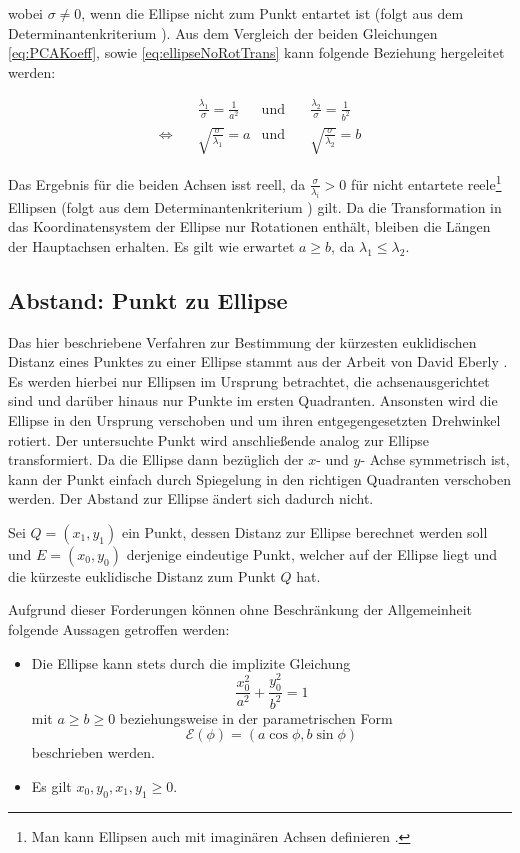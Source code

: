 wobei $\sigma \neq 0$, wenn die Ellipse nicht zum Punkt entartet ist (folgt aus dem Determinantenkriterium \cite{Lawrence1972}). Aus dem Vergleich der beiden Gleichungen \ref{eq:PCAKoeff}, sowie \ref{eq:ellipseNoRotTrans} kann folgende Beziehung hergeleitet werden:

\begin{equation}
\begin{aligned}
&\frac{\lambda_1}{\sigma} = \frac{1}{a^2} &\text{und}\quad &\frac{\lambda_2}{\sigma} = \frac{1}{b^2}\\
\Leftrightarrow\quad & \sqrt{\frac{\sigma}{\lambda_1}}  = a  &\text{und}\quad & \sqrt{\frac{\sigma}{\lambda_2}}  = b
\end{aligned}
\end{equation}

Das Ergebnis für die beiden Achsen isst reell, da $\frac{\sigma}{\lambda_i} > 0$ für nicht entartete reele\footnote{Man kann Ellipsen auch mit imaginären Achsen definieren \cite{Lawrence1972}.}  Ellipsen (folgt aus dem Determinantenkriterium \cite{Lawrence1972}) gilt. Da die Transformation in das Koordinatensystem der Ellipse nur Rotationen enthält,  bleiben die Längen der Hauptachsen erhalten. Es gilt wie erwartet $a \geq b$, da $\lambda_1 \leq \lambda_2$.


\subsection{Abstand: Punkt zu Ellipse}
\label{sc:distPointEllipse}
Das hier beschriebene Verfahren zur Bestimmung der kürzesten euklidischen Distanz eines Punktes zu einer Ellipse stammt aus der Arbeit von David Eberly \cite{Eberly2013}.
Es werden hierbei nur Ellipsen im Ursprung betrachtet, die achsenausgerichtet sind und darüber hinaus nur Punkte im ersten Quadranten. Ansonsten wird die Ellipse in den Ursprung verschoben und um ihren entgegengesetzten Drehwinkel rotiert.
Der untersuchte Punkt wird anschließende analog zur Ellipse transformiert.
Da die Ellipse dann bezüglich der $x$- und $y$- Achse symmetrisch ist, kann der Punkt einfach durch Spiegelung in den richtigen Quadranten verschoben werden. Der Abstand zur Ellipse ändert sich dadurch nicht.

Sei $Q = (x_1, y_1)$ ein Punkt, dessen Distanz zur Ellipse berechnet werden soll und $E = (x_0, y_0)$ derjenige eindeutige Punkt, welcher auf der Ellipse liegt und die kürzeste euklidische Distanz zum Punkt $Q$ hat.

Aufgrund dieser Forderungen können ohne Beschränkung der Allgemeinheit folgende Aussagen getroffen werden:
\begin{itemize}
	\item Die Ellipse kann stets durch die implizite Gleichung
	\begin{equation}\label{eq:distEqParam} \frac{x_0^2}{a^2} + \frac{y_0^2}{b^2} = 1\end{equation}
	 mit $a \geq b \geq 0$ beziehungsweise
	in der parametrischen Form \[\mathcal{E}(\phi) = (a\cos\phi, b\sin\phi)  \tag*{$\phi \in [0, 2\pi)$}\] beschrieben werden.
	\item Es gilt $x_0,y_0,x_1,y_1 \geq 0$.
\end{itemize}

